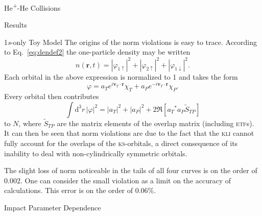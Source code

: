 \documentclass[letterpaper, 11 pt]{report}
\begin{document}
\begin{chapter}{\texorpdfstring{He\textsuperscript{+}}{He+}-He Collisions \label{chap:hephe}}
\begin{section}{Results \label{sec:hephe-disc}}
\begin{subsection}{1\textit{s}-only Toy Model \label{sec:toy}}
         The origins of the norm violations is easy to trace. According to Eq.~\eqref{eq:dendef2} the
         one-particle density may be written
         \begin{equation} \label{eq:toyden}
            n(\mathbf{r},t) = \left| \varphi_{1 \uparrow}\right|^2
                            + \left| \varphi_{2 \uparrow}\right|^2
                            + \left| \varphi_{1 \downarrow}\right|^2.
         \end{equation}
         Each orbital in the above expression is normalized to 1 and takes the form
         \begin{equation}
            \varphi = a_T e^{i \mathbf{v}_T \cdot \mathbf{r}} \chi_T
                    + a_P e^{-i \mathbf{v}_T \cdot \mathbf{r}} \chi_P.
         \end{equation}
         Every orbital then contributes
         \begin{equation}
            \int \mathrm{d}^3 r \, \left| \varphi \right|^2 = \left| a_T \right|^2
                                                            + \left| a_P \right|^2
            + 2 \Re \left[ {a_T}^* a_P \tilde{S}_{TP} \right]
         \end{equation}
         to $N$, where $\tilde{S}_{TP}$ are the matrix elements of the overlap matrix (including
         \textsc{etf}s). It can then be seen that norm violations are due to the fact that
         the \textsc{kli} cannot fully account for the overlaps of the \textsc{ks}-orbitals, a direct
         consequence of its inability to deal with non-cylindrically symmetric orbitals.

         The slight loss of norm noticeable in the tails of all four curves is on the order of $0.002$.
         One can consider the small violation as a limit on the accuracy of calculations. This error is
         on the order of $0.06 \%$.

      \end{subsection}

      \begin{subsection}{Impact Parameter Dependence}


\end{subsection}
\end{section}
\end{chapter}
\end{document}
